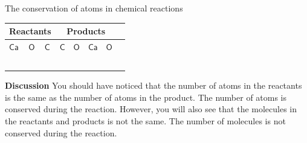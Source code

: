 \begin{activity}{The conservation of atoms in chemical reactions }
\begin{minipage}{.4\textwidth}
\begin{center}
\end{center}
\end{minipage}
        \par 
\begin{table}[H]
 \begin{center}
  \begin{tabular}{|l|l|l||l|l|l|l|l|} \hline
   \multicolumn{3}{|c||}{\textbf{Reactants}} & \multicolumn{4}{|c|}{\textbf{Products}} \\ \hline
$\mathsf{Ca}$ & $\mathsf{O}$ & $\mathsf{C}$ & $\mathsf{C}$ & $\mathsf{O}$ & $\mathsf{Ca}$ & $\mathsf{O}$ \\ \hline
&&&&&& \\ \hline
&&&&&& \\ \hline
&&&&&& \\ \hline
&&&&&& \\ \hline
&&&&&& \\ \hline
  \end{tabular}

 \end{center}

\end{table}

      \label{m38711*id65031}\noindent{}\textbf{Discussion}
     You should have noticed that the number of atoms in the reactants is the same as the number of atoms in the product. The number of atoms is conserved during the reaction. However, you will also see that the molecules in the reactants and products is not the same. The number of molecules is not conserved during the reaction.
 \par 
\end{activity}
\label{m38711*eip-14}
